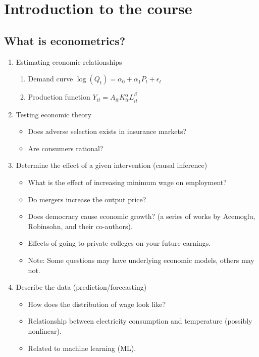 \documentclass[]{book}
\providecommand{\tightlist}{%
  \setlength{\itemsep}{0pt}\setlength{\parskip}{0pt}}
\begin{document}
\hypertarget{introduction-to-the-course}{%
\chapter{Introduction to the course}\label{introduction-to-the-course}}

\hypertarget{what-is-econometrics}{%
\section{What is econometrics?}\label{what-is-econometrics}}

\begin{enumerate}
\def\labelenumi{\arabic{enumi}.}
\tightlist
\item
  Estimating economic relationships

  \begin{enumerate}
  \def\labelenumii{\arabic{enumii}.}
  \tightlist
  \item
    Demand curve \(\log(Q_{t})= \alpha_0 + \alpha_1 P_t + \epsilon_t\)
  \item
    Production function \(Y_{it}=A_{it}K_{it}^{\alpha}L_{it}^{\beta}\)
  \end{enumerate}
\item
  Testing economic theory

  \begin{itemize}
  \tightlist
  \item
    Does adverse selection exists in insurance markets?
  \item
    Are consumers rational?
  \end{itemize}
\item
  Determine the effect of a given intervention (causal inference)

  \begin{itemize}
  \tightlist
  \item
    What is the effect of increasing minimum wage on employment?
  \item
    Do mergers increase the output price?
  \item
    Does democracy cause economic growth? (a series of works by Acemoglu, Robinsohn, and their co-authors).
  \item
    Effects of going to private colleges on your future earnings.
  \item
    Note: Some questions may have underlying economic models, others may not.
  \end{itemize}
\item
  Describe the data (prediction/forecasting)

  \begin{itemize}
  \tightlist
  \item
    How does the distribution of wage look like?
  \item
    Relationship between electricity consumption and temperature (possibly nonlinear).
  \item
    Related to machine learning (ML).
  \end{itemize}
\end{enumerate}
\end{document}
